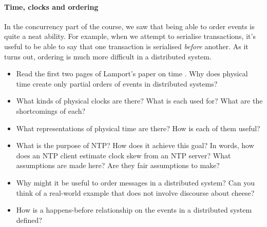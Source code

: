 \documentclass[12pt,a4paper,oneside,openright]{report}
\newcommand{\question}[2]{\paragraph{#1} #2}
\begin{document}
\question{Time, clocks and ordering}{In the concurrency part of the
  course, we saw that being able to order events is quite a neat
  ability. For example, when we attempt to serialise transactions,
  it's useful to be able to say that one transaction is serialised
  \emph{before} another. As it turns out, ordering is much more
  difficult in a distributed system.
  \begin{itemize}
  \item Read the first two pages of Lamport's paper on time
    \cite{lamport1978time}. Why does physical time create only partial
    orders of events in distributed systems?
  \item What kinds of physical clocks are there? What is each used
    for? What are the shortcomings of each?
  \item What representations of physical time are there? How is each
    of them useful?
  \item What is the purpose of NTP? How does it achieve this goal? In
    words, how does an NTP client estimate clock skew from an NTP
    server? What assumptions are made here? Are they fair assumptions
    to make?
  \item Why might it be useful to order messages in a distributed
    system? Can you think of a real-world example that does not
    involve discourse about cheese?
  \item How is a happens-before relationship on the events in a
    distributed system defined?
  \end{itemize}
}
\end{document}
